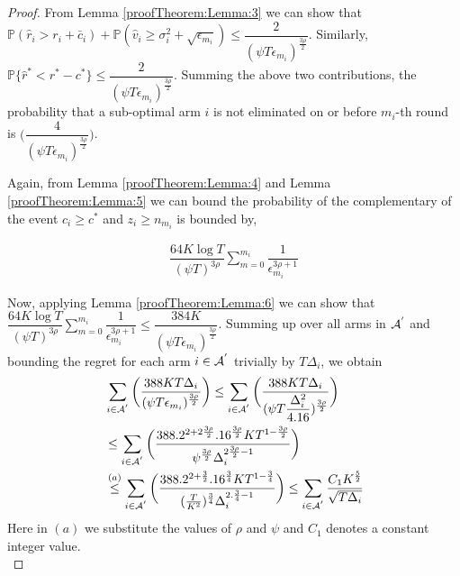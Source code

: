 \begin{proof}

From Lemma \ref{proofTheorem:Lemma:3} we can show that $\mathbb{P}\left( \hat{r}_{i} > r_{i}+ \bar{c}_i\right) + \mathbb{P}\left( \hat{v}_{i}\geq \sigma_{i}^{2}+\sqrt{\epsilon_{m_{i}}}\right) \leq \dfrac{2}{(\psi  T\epsilon_{m_{i}})^{\frac{3\rho}{2}}}$. Similarly, $\mathbb{P}\lbrace\hat{r}^{*} < r^{*} - c^{*}\rbrace \leq \dfrac{2}{(\psi  T\epsilon_{m_{i}})^{\frac{3\rho}{2}}}$. Summing the above two contributions, the probability that a sub-optimal arm ${i}$ is not eliminated on or before $m_{i}$-th round is  $\bigg(\dfrac{4}{(\psi T\epsilon_{m_{i}})^{\frac{3\rho}{2}}} \bigg)$.

Again, from Lemma \ref{proofTheorem:Lemma:4} and Lemma \ref{proofTheorem:Lemma:5} we can bound the probability of the  complementary of the event $c_{i} \geq c^* $ and $ z_i \geq n_{m_i}$ is bounded by,

\begin{align*}
\dfrac{64K\log T}{(\psi T)^{3\rho}}\sum_{m=0}^{m_i}\dfrac{1}{\epsilon_{m_i}^{3\rho + 1}}
\end{align*}

Now, applying Lemma \ref{proofTheorem:Lemma:6} we can show that $\dfrac{64 K\log T}{(\psi T)^{3\rho}}\sum_{m=0}^{m_i}\dfrac{1}{\epsilon_{m_i}^{3\rho + 1}} \leq \dfrac{ 384 K }{(\psi T \epsilon_{m_i})^{\frac{3\rho}{2}}}$. Summing up over all arms in $\mathcal{A}^{'}$ and bounding the regret for each arm $i\in \mathcal{A}^{'}$ trivially by $T\Delta_{i}$, we obtain
   \begin{align*}
&\sum_{i\in \mathcal{A}^{'}}\bigg(\dfrac{388 K T\Delta_{i}}{(\psi T\epsilon_{m_{i}})^{\frac{3\rho}{2}}}\bigg)
\leq\sum_{i\in \mathcal{A}^{'}}\bigg(\dfrac{388 K T\Delta_{i}}{(\psi T\dfrac{\Delta_{i}^{2}}{4.16})^{\frac{3\rho}{2}}}\bigg)\\
&\leq \sum_{i\in \mathcal{A}^{'}}\bigg(\dfrac{388.2^{2+2\frac{3\rho}{2}}.16^{\frac{3\rho}{2}} K T^{1-\frac{3\rho}{2}}}{\psi^{\frac{3\rho}{2}}\Delta_{i}^{2\frac{3\rho}{2} -1}}\bigg)\\  
& \overset{(a)}{\leq} \sum_{i\in \mathcal{A}^{'}}\bigg(\dfrac{388.2^{2+\frac{3}{2}}.16^{\frac{3}{4}} K T^{1-\frac{3}{4}}}{(\frac{T}{K^2})^{\frac{3}{4}}\Delta_{i}^{2.\frac{3}{4} -1}}\bigg)\leq \sum_{i\in \mathcal{A}^{'}}\dfrac{C_1 K^{\frac{5}{2}}}{\sqrt{T\Delta_i}}  
   \end{align*}
Here in $(a)$ we substitute the values of $\rho$ and $\psi$ and $C_1$ denotes a constant integer value.\\




\end{proof}
